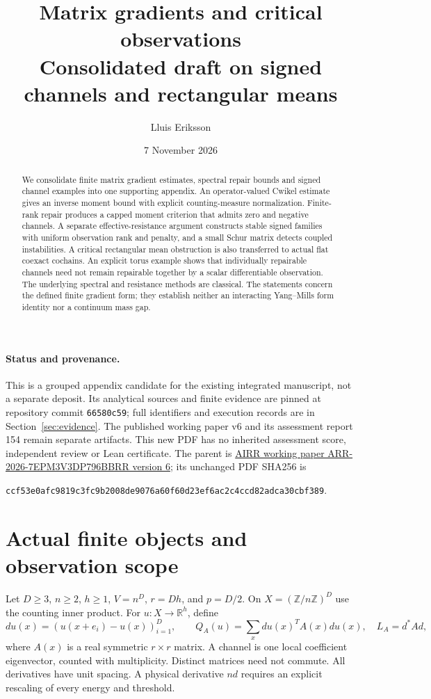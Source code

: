 \documentclass[11pt,a4paper]{article}
\title{Matrix gradients and critical observations\\
\large Consolidated draft on signed channels and rectangular means}
\author{Lluis Eriksson}
\date{7 November 2026}
\newcommand{\R}{\mathbb R}
\begin{document}
\maketitle
\begin{abstract}
We consolidate finite matrix gradient estimates, spectral repair bounds and
signed channel examples into one supporting appendix. An operator-valued
Cwikel estimate gives an inverse moment bound with explicit counting-measure
normalization. Finite-rank repair produces a capped moment criterion that
admits zero and negative channels. A separate effective-resistance argument
constructs stable signed families with uniform observation rank and penalty,
and a small Schur matrix detects coupled instabilities. A critical rectangular mean obstruction is also transferred to actual flat coexact cochains. An explicit torus
example shows that individually repairable channels need not remain
repairable together by a scalar differentiable observation. The underlying
spectral and resistance methods are classical. The statements concern the
defined finite gradient form; they establish neither an interacting
Yang--Mills form identity nor a continuum mass gap.
\end{abstract}

\paragraph{Status and provenance.}
This is a grouped appendix candidate for the existing integrated manuscript,
not a separate deposit. Its analytical sources and finite evidence are pinned
at repository commit \texttt{66580c59}; full identifiers and execution records
are in Section~\ref{sec:evidence}. The published working paper v6 and its
assessment report 154 remain separate artifacts. This new PDF has no inherited
assessment score, independent review or Lean certificate.
The parent is
\href{https://airr.science/papers/ARR-2026-7EPM3V3DP796BBRR/versions/v6/}
{AIRR working paper ARR-2026-7EPM3V3DP796BBRR version 6}; its unchanged PDF
SHA256 is
\begin{center}\scriptsize
\texttt{ccf53e0afc9819c3fc9b2008de9076a60f60d23ef6ac2c4ccd82adca30cbf389}.
\end{center}

\section{Actual finite objects and observation scope}
Let $D\geq3$, $n\geq2$, $h\geq1$, $V=n^D$, $r=Dh$, and $p=D/2$.
On $X=(\mathbb Z/n\mathbb Z)^D$ use the counting inner product. For
$u:X\to\R^h$, define
\[
 du(x)=(u(x+e_i)-u(x))_{i=1}^D,\qquad
 Q_A(u)=\sum_x du(x)^T A(x)du(x),\quad L_A=d^*A d,
\]
where $A(x)$ is a real symmetric $r\times r$ matrix. A channel is one local
coefficient eigenvector, counted with multiplicity. Distinct matrices need
not commute. All derivatives have unit spacing. A physical derivative $nd$
requires an explicit rescaling of every energy and threshold.
\end{document}
